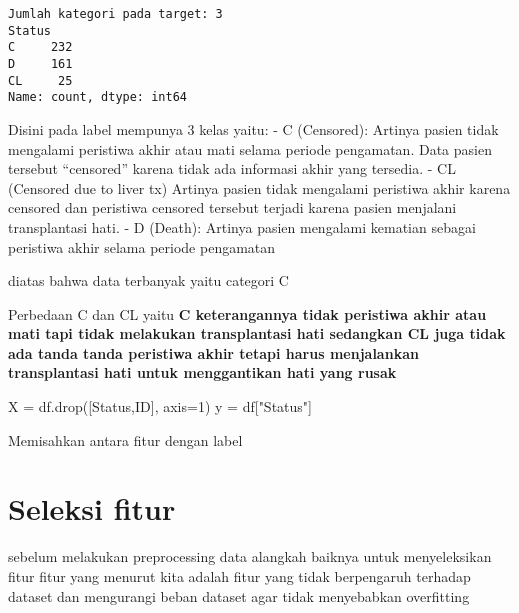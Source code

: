 \documentclass[
  letterpaper,
]{krantz}
\makeatletter
\newenvironment{Shaded}{\begin{snugshade}}{\end{snugshade}}
\newcommand{\DecValTok}[1]{\textcolor[rgb]{0.68,0.00,0.00}{#1}}
\newcommand{\NormalTok}[1]{\textcolor[rgb]{0.00,0.23,0.31}{#1}}
\newcommand{\OperatorTok}[1]{\textcolor[rgb]{0.37,0.37,0.37}{#1}}
\newcommand{\StringTok}[1]{\textcolor[rgb]{0.13,0.47,0.30}{#1}}
\newenvironment{kframe}{%
\medskip{}
\setlength{\fboxsep}{.8em}
 \def\at@end@of@kframe{}%
 \ifinner\ifhmode%
  \def\at@end@of@kframe{\end{minipage}}%
  \begin{minipage}{\columnwidth}%
 \fi\fi%
 \def\FrameCommand##1{\hskip\@totalleftmargin \hskip-\fboxsep
 \colorbox{shadecolor}{##1}\hskip-\fboxsep
     \hskip-\linewidth \hskip-\@totalleftmargin \hskip\columnwidth}%
 \MakeFramed {\advance\hsize-\width
   \@totalleftmargin\z@ \linewidth\hsize
   \@setminipage}}%
 {\par\unskip\endMakeFramed%
 \at@end@of@kframe}
\renewenvironment{Shaded}{\begin{kframe}}{\end{kframe}}
\makeatother
\begin{document}
\begin{verbatim}
Jumlah kategori pada target: 3
Status
C     232
D     161
CL     25
Name: count, dtype: int64
\end{verbatim}

Disini pada label mempunya 3 kelas yaitu: - C (Censored): Artinya pasien
tidak mengalami peristiwa akhir atau mati selama periode pengamatan.
Data pasien tersebut ``censored'' karena tidak ada informasi akhir yang
tersedia. - CL (Censored due to liver tx) Artinya pasien tidak mengalami
peristiwa akhir karena censored dan peristiwa censored tersebut terjadi
karena pasien menjalani transplantasi hati. - D (Death): Artinya pasien
mengalami kematian sebagai peristiwa akhir selama periode pengamatan

diatas bahwa data terbanyak yaitu categori C

Perbedaan C dan CL yaitu \textbf{C keterangannya tidak peristiwa akhir
atau mati tapi tidak melakukan transplantasi hati sedangkan CL juga
tidak ada tanda tanda peristiwa akhir tetapi harus menjalankan
transplantasi hati untuk menggantikan hati yang rusak}

\begin{Shaded}
\begin{Highlighting}[]
\NormalTok{X }\OperatorTok{=}\NormalTok{ df.drop([}\StringTok{\textquotesingle{}Status\textquotesingle{}}\NormalTok{,}\StringTok{\textquotesingle{}ID\textquotesingle{}}\NormalTok{], axis}\OperatorTok{=}\DecValTok{1}\NormalTok{)}
\NormalTok{y }\OperatorTok{=}\NormalTok{ df[}\StringTok{"Status"}\NormalTok{]}
\end{Highlighting}
\end{Shaded}

Memisahkan antara fitur dengan label

\hypertarget{seleksi-fitur}{%
\section*{Seleksi fitur}\label{seleksi-fitur}}


sebelum melakukan preprocessing data alangkah baiknya untuk
menyeleksikan fitur fitur yang menurut kita adalah fitur yang tidak
berpengaruh terhadap dataset dan mengurangi beban dataset agar tidak
menyebabkan overfitting
\end{document}
